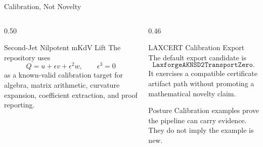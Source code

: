 \documentclass[aspectratio=169,11pt]{beamer}
\begin{document}
\begin{frame}{Calibration, Not Novelty}
  \begin{columns}[T,totalwidth=\textwidth]
    \begin{column}{0.50\textwidth}
      \begin{block}{Second-Jet Nilpotent mKdV Lift}
        The repository uses
        \[
          Q = u + \epsilon v + \epsilon^2 w,\qquad \epsilon^3=0
        \]
        as a known-valid calibration target for algebra, matrix arithmetic,
        curvature expansion, coefficient extraction, and proof reporting.
      \end{block}
    \end{column}
    \begin{column}{0.46\textwidth}
      \begin{block}{LAXCERT Calibration Export}
        The default export candidate is
        \[
          \texttt{LaxforgeAKNSD2TransportZero}.
        \]
        It exercises a compatible certificate artifact path without promoting a
        mathematical novelty claim.
      \end{block}
      \begin{alertblock}{Posture}
        Calibration examples prove the pipeline can carry evidence. They do not
        imply the example is new.
      \end{alertblock}
    \end{column}
  \end{columns}
\end{frame}
\end{document}
